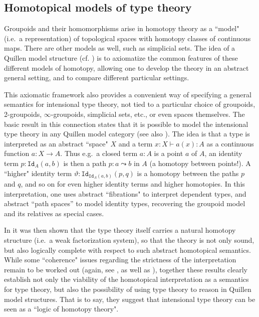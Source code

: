 \documentclass[reqno,12pt]{amsart}
\renewcommand{\to}{\rightarrow}
\newcommand{\id}[1]{\texttt{Id}_{#1}}
\theoremstyle{definition}
\theoremstyle{remark}
\begin{document}
\subsection{Homotopical models of type theory}\label{subsec:qmint}

Groupoids and their homomorphisms arise in homotopy theory as a ``model" (i.e.\ a representation) of topological spaces with homotopy classes of continuous maps.  There are other models as well, such as simplicial sets.  The idea of a Quillen model structure (cf. \cite{Quillen:HA,Bousfield:CFSC}) is to axiomatize the common features of these different models of homotopy, allowing one to develop the theory in an abstract general setting, and to compare different particular settings.  

This axiomatic framework also provides a convenient way of specifying a general semantics for intensional type theory, not tied to a particular choice of groupoids, 2-groupoids, $\infty$-groupoids, simplicial sets, etc., or even spaces themselves. The basic result in this connection states that it is possible to model the intensional type theory in any Quillen model category \cite{Awodey:HMIT} (see also \cite{Warren:PhD}).  The idea is that a type is interpreted as an abstract ``space" $X$ and a term $x:X \vdash a(x):A$ as a continuous function $a : X\to A$.  Thus e.g.\ a closed term $a:A$ is a point $a$ of $A$, an identity term $p : \id{A}(a,b)$ is then a path $p:a \leadsto b$ in $A$ (a homotopy between points!). A ``higher" identity term  $\vartheta:\id{\id{A}(a,b)}(p,q)$ is a homotopy between the paths $p$ and $q$, and so on for even higher identity terms and higher homotopies.  In this interpretation, one uses abstract ``fibrations" to interpret dependent types, and abstract ``path spaces'' to model identity types, recovering the groupoid model and its relatives as special cases. 

In \cite{Gambino:ITWFS} %
it was then shown that the type theory itself carries a natural homotopy structure (i.e.\ a weak factorization system), so that the theory is not only sound, but also logically complete with respect to such abstract homotopical semantics.  While some ``coherence" issues regarding the strictness of the interpretation remain to be worked out (again, see \cite{Warren:PhD}, as well as \cite{vdBG:TSMIT}),  together these results clearly establish not only the viability of the homotopical interpretation as a semantics for type theory, but also the possibility of using type theory to reason in Quillen model structures.  That is to say, they suggest that intensional type theory can be seen as a ``logic of homotopy theory".
\end{document}

